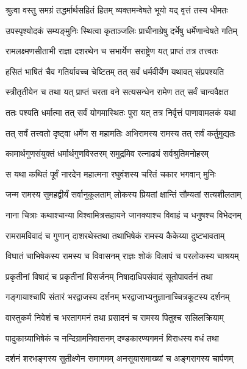 
\twolineshloka
{श्रुत्वा वस्तु समग्रं तद्धर्मार्थसहितं हितम्}
{व्यक्तमन्वेषते भूयो यद् वृत्तं तस्य धीमतः} %

\twolineshloka
{उपस्पृश्योदकं सम्यङ्मुनिः स्थित्वा कृताञ्जलिः}
{प्राचीनाग्रेषु दर्भेषु धर्मेणान्वेषते गतिम्} %

\twolineshloka
{रामलक्ष्मणसीताभी राज्ञा दशरथेन च}
{सभार्येण सराष्ट्रेण यत् प्राप्तं तत्र तत्त्वतः} %

\twolineshloka
{हसितं भाषितं चैव गतिर्यावच्च चेष्टितम्}
{तत् सर्वं धर्मवीर्येण यथावत् संप्रपश्यति} %

\twolineshloka
{स्त्रीतृतीयेन च तथा यत् प्राप्तं चरता वने}
{सत्यसन्धेन रामेण तत् सर्वं चान्ववैक्षत} %

\twolineshloka
{ततः पश्यति धर्मात्मा तत् सर्वं योगमास्थितः}
{पुरा यत् तत्र निर्वृत्तं पाणावामलकं यथा} %

\twolineshloka
{तत् सर्वं तत्त्वतो दृष्ट्वा धर्मेण स महामतिः}
{अभिरामस्य रामस्य तत् सर्वं कर्तुमुद्यतः} %

\twolineshloka
{कामार्थगुणसंयुक्तं धर्मार्थगुणविस्तरम्}
{समुद्रमिव रत्नाढ्यं सर्वश्रुतिमनोहरम्} %

\twolineshloka
{स यथा कथितं पूर्वं नारदेन महात्मना}
{रघुवंशस्य चरितं चकार भगवान् मुनिः} %

\twolineshloka
{जन्म रामस्य सुमहद्वीर्यं सर्वानुकूलताम्}
{लोकस्य प्रियतां क्षान्तिं सौम्यतां सत्यशीलताम्} %

\twolineshloka
{नाना चित्राः कथाश्चान्या विश्वामित्रसहायने}
{जानक्याश्च विवाहं च धनुषश्च विभेदनम्} %

\twolineshloka
{रामरामविवादं च गुणान् दाशरथेस्तथा}
{तथाभिषेकं रामस्य कैकेय्या दुष्टभावताम्} %

\twolineshloka
{विघातं चाभिषेकस्य रामस्य च विवासनम्}
{राज्ञः शोकं विलापं च परलोकस्य चाश्रयम्} %

\twolineshloka
{प्रकृतीनां विषादं च प्रकृतीनां विसर्जनम्}
{निषादाधिपसंवादं सूतोपावर्तनं तथा} %

\twolineshloka
{गङ्गायाश्चापि संतारं भरद्वाजस्य दर्शनम्}
{भरद्वाजाभ्यनुज्ञानाच्चित्रकूटस्य दर्शनम्} %

\twolineshloka
{वास्तुकर्म निवेशं च भरतागमनं तथा}
{प्रसादनं च रामस्य पितुश्च सलिलक्रियाम्} %

\twolineshloka
{पादुकाग्र्याभिषेकं च नन्दिग्रामनिवासनम्}
{दण्डकारण्यगमनं विराधस्य वधं तथा} %

\twolineshloka
{दर्शनं शरभङ्गस्य सुतीक्ष्णेन समागमम्}
{अनसूयासमाख्यां च अङ्गरागस्य चार्पणम्} %

